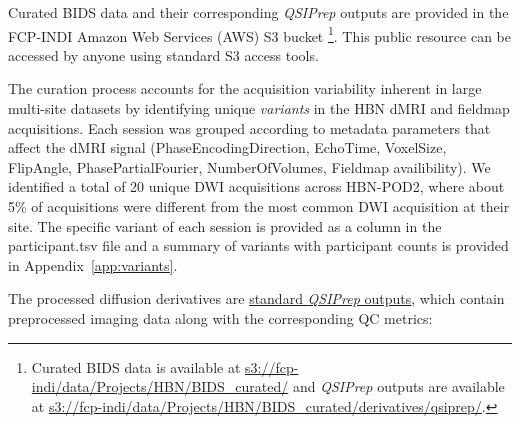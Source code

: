 \documentclass[9pt,lineno]{elife}
\begin{document}
Curated BIDS data and their corresponding \emph{QSIPrep} outputs are provided in the FCP-INDI Amazon Web Services (AWS) S3 bucket
\footnote{%
    Curated BIDS data is available at 
    \url{s3://fcp-indi/data/Projects/HBN/BIDS_curated/}
    and \emph{QSIPrep} outputs are available at
    \url{s3://fcp-indi/data/Projects/HBN/BIDS_curated/derivatives/qsiprep/}.
}. This public resource can be accessed by anyone using standard S3 access tools.

The curation process accounts for the acquisition variability inherent in large multi-site datasets
by identifying unique \emph{variants} in the HBN 
dMRI and fieldmap acquisitions. Each session was grouped according to metadata parameters that
affect the dMRI signal (PhaseEncodingDirection, EchoTime, VoxelSize, FlipAngle, PhasePartialFourier,
NumberOfVolumes, Fieldmap availibility). We identified a total of 20 unique DWI acquisitions across
HBN-POD2, where about 5\% of acquisitions were different from the most common DWI acquisition at their
site. The specific variant of each session is provided as a column in the participant.tsv file and a summary of variants with participant counts is provided in Appendix~\ref{app:variants}.

The processed diffusion derivatives are \href{
https://qsiprep.readthedocs.io/en/latest/preprocessing.html#outputs-of-qsiprep}{
standard \emph{QSIPrep} outputs}, which contain preprocessed imaging data
along with the corresponding QC metrics:
\end{document}
